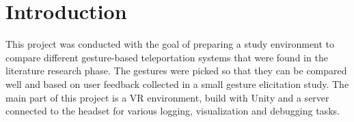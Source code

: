 
\chapter{Introduction}
This project was conducted with the goal of preparing a study environment to compare different gesture-based teleportation systems that were found in the literature research phase. The gestures were picked so that they can be compared well and based on user feedback collected in a small gesture elicitation study. The main part of this project is a VR environment, build with Unity and a server connected to the headset for various logging, visualization and debugging tasks.
